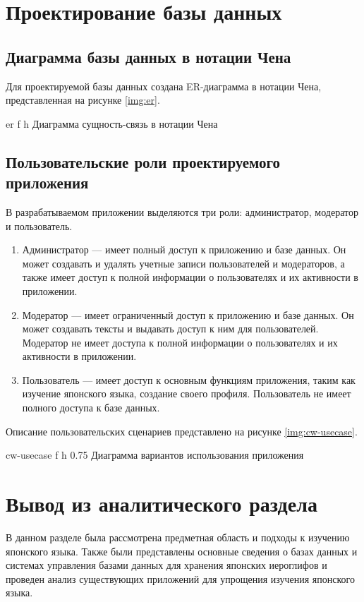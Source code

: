 \section{Проектирование базы данных}

\subsection{Диаграмма базы данных в нотации Чена}

Для проектируемой базы данных создана ER-диаграмма в нотации Чена, представленная на рисунке \ref{img:er}.

\clearpage

  {er}
  {f}
  {h}
  {\linewidth}
  {Диаграмма сущность-связь в нотации Чена}

\subsection{Пользовательские роли проектируемого приложения}

В разрабатываемом приложении выделяются три роли: администратор,
модератор и пользователь.

\begin{enumerate}
  \item Администратор --- имеет полный
    доступ к приложению и базе данных. Он может создавать и 
    удалять учетные записи пользователей и модераторов, а также имеет доступ к полной информации о пользователях и их активности в приложении.
  \item Модератор --- имеет ограниченный 
    доступ к приложению и базе данных. Он может создавать тексты и
    выдавать доступ к ним для пользователей. Модератор не имеет доступа к полной информации о пользователях и их активности в приложении.
  \item Пользователь --- имеет 
    доступ к основным функциям приложения, таким как изучение 
    японского языка, создание своего профиля. Пользователь не имеет полного доступа к базе данных.
\end{enumerate}

Описание пользовательских сценариев представлено на рисунке \ref{img:cw-usecase}.

  {cw-usecase}
  {f}
  {h}
  {0.75\linewidth}
  {Диаграмма вариантов использования приложения}

\clearpage

\section*{Вывод из аналитического раздела}

В данном разделе была рассмотрена предметная область и подходы
к изучению японского языка. Также были представлены основные сведения
о базах данных и системах управления базами данных для хранения
японских иероглифов и проведен анализ существующих приложений
для упрощения изучения японского языка.

